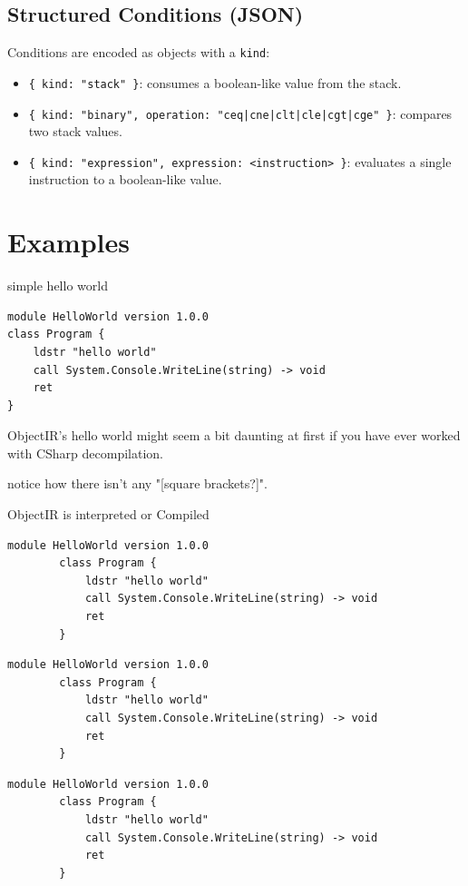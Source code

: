 \documentclass[11pt,a4paper]{article}
\begin{document}
	\subsection{Structured Conditions (JSON)}
	Conditions are encoded as objects with a \texttt{kind}:
	\begin{itemize}
		\item \texttt{\{ kind: "stack" \}}: consumes a boolean-like value from the stack.
		\item \texttt{\{ kind: "binary", operation: "ceq|cne|clt|cle|cgt|cge" \}}: compares two stack values.
		\item \texttt{\{ kind: "expression", expression: <instruction> \}}: evaluates a single instruction to a boolean-like value.
	\end{itemize}
	
	
	
	
	\section{Examples}
	simple hello world
	\begin{lstlisting}[language=ObjectIR]
module HelloWorld version 1.0.0 
class Program {
	ldstr "hello world"
	call System.Console.WriteLine(string) -> void
	ret
}	
	\end{lstlisting}
	ObjectIR's hello world might seem a bit daunting at first if you
	have ever worked with CSharp decompilation.
	
	notice how there isn't any "[square brackets?]".
	
	ObjectIR is interpreted or Compiled
	
	
	
	\begin{lstlisting}[language=ObjectIR]
		module HelloWorld version 1.0.0 
		class Program {
			ldstr "hello world"
			call System.Console.WriteLine(string) -> void
			ret
		}	
	\end{lstlisting}
	
		\begin{lstlisting}[language=ObjectIR]
		module HelloWorld version 1.0.0 
		class Program {
			ldstr "hello world"
			call System.Console.WriteLine(string) -> void
			ret
		}	
	\end{lstlisting}
	
		\begin{lstlisting}[language=ObjectIR]
		module HelloWorld version 1.0.0 
		class Program {
			ldstr "hello world"
			call System.Console.WriteLine(string) -> void
			ret
		}	
	\end{lstlisting}
	
\end{document}
